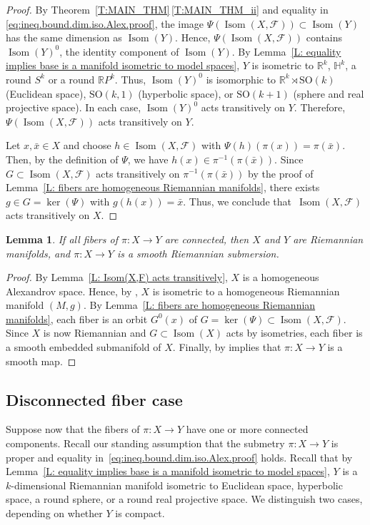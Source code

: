 \documentclass[10pt,a4paper]{amsart}
\numberwithin{equation}{section}
\newtheorem{lem}[thm]{Lemma}
\theoremstyle{definition}
\DeclareMathOperator{\Iso}{Isom}
\newcommand{\R}{\mathbb{R}} %
\newcommand{\RP}{\mathbb{R}P} %
\newcommand{\fol}{\mathcal{F}}
\begin{document}
\begin{proof}
By Theorem~\ref{T:MAIN_THM}\,\ref{T:MAIN_THM_ii} and equality in
\eqref{eq:ineq.bound.dim.iso.Alex.proof}, the image $\Psi(\Iso(X,\fol))\subset \Iso(Y)$ has the same dimension as $\Iso(Y)$.
Hence, $\Psi(\Iso(X,\fol))$ contains $\Iso(Y)^0$, the identity component of $\Iso(Y)$.
By Lemma~\ref{L: equality implies base is a manifold isometric to model spaces}, $Y$ is isometric to $\mathbb{R}^k$, $\mathbb{H}^k$, a round $S^k$ or a round $\RP^k$.
Thus, $\Iso(Y)^0$ is isomorphic to $\R^k\rtimes \mathrm{SO}(k)$ (Euclidean space), $\mathrm{SO}(k,1)$ (hyperbolic space), or ${\mathrm{SO}(k+1)}$ (sphere and real projective space).
In each case, $\Iso(Y)^0$ acts transitively on $Y$.
Therefore, $\Psi(\Iso(X,\fol))$ acts transitively on $Y$.


Let $x,\bar{x}\in X$ and choose $h\in \Iso(X,\fol)$ with
$\Psi(h)(\pi(x))=\pi(\bar{x})$.
Then, by the definition of $\Psi$, we have $h(x)\in\pi^{-1}(\pi(\bar{x}))$.
Since $G\subset \Iso(X,\fol)$ acts transitively on $\pi^{-1}(\pi(\bar{x}))$ by the proof of Lemma~\ref{L: fibers are homogeneous Riemannian manifolds}, there exists $g\in G=\ker(\Psi)$ with $g(h(x))=\bar{x}$.
Thus, we conclude that~$\Iso(X,\fol)$ acts transitively on $X$.
\end{proof}

\begin{lem}
\label{L:connected.case.submetry.is.a.riemannian.submersion}
If all fibers of $\pi\colon X\to Y$ are connected, then $X$ and $Y$ are Riemannian manifolds, and $\pi\colon X\to Y$ is a smooth Riemannian submersion.
\end{lem}

\begin{proof}
By Lemma~\ref{L: Isom(X,F) acts transitively}, $X$ is a homogeneous Alexandrov space. Hence, by \cite[Theorem 7]{Berestovskii1989}, $X$ is isometric to a homogeneous Riemannian manifold $(M,g)$.
By Lemma~\ref{L: fibers are homogeneous Riemannian manifolds}, each fiber is an orbit $G^0(x)$ of $G=\ker(\Psi)\subset \Iso(X,\fol)$.
Since $X$ is now Riemannian and $G\subset \Iso(X)$ acts by isometries, each fiber is a smooth embedded submanifold of $X$.
Finally, by \cite[Lemma 13.1]{LytchakWilking2024} implies that $\pi\colon X\to Y$ is a smooth map.
\end{proof}


\subsection{Disconnected fiber case} Suppose now that the fibers of $\pi\colon X\to Y$ have one or more connected components.
Recall our standing assumption that the submetry $\pi\colon X\to Y$ is proper and equality in~\eqref{eq:ineq.bound.dim.iso.Alex.proof} holds. Recall that by Lemma~\ref{L: equality implies base is a manifold isometric to model spaces}, $Y$ is a $k$-dimensional Riemannian manifold isometric to Euclidean space, hyperbolic space, a round sphere, or a round real projective space. We distinguish two cases, depending on whether $Y$ is compact.
\end{document}
